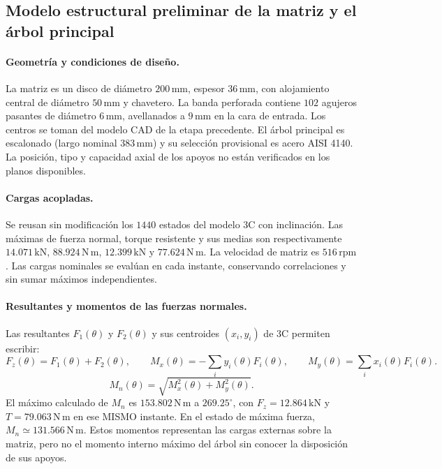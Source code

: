 \subsection{Modelo estructural preliminar de la matriz y el árbol principal}
\paragraph{Geometría y condiciones de diseño.}
La matriz es un disco de diámetro $200\,\mathrm{mm}$, espesor $36\,\mathrm{mm}$, con alojamiento central de diámetro $50\,\mathrm{mm}$ y chavetero. La banda perforada contiene $102$ agujeros pasantes de diámetro $6\,\mathrm{mm}$, avellanados a $9\,\mathrm{mm}$ en la cara de entrada. Los centros se toman del modelo CAD de la etapa precedente. El árbol principal es escalonado (largo nominal $383\,\mathrm{mm}$) y su selección provisional es acero AISI 4140. La posición, tipo y capacidad axial de los apoyos no están verificados en los planos disponibles.

\paragraph{Cargas acopladas.}
Se reusan sin modificación los $1440$ estados del modelo 3C con inclinación. Las máximas de fuerza normal, torque resistente y sus medias son respectivamente $14.071\,\mathrm{kN}$, $88.924\,\mathrm{N\,m}$, $12.399\,\mathrm{kN}$ y $77.624\,\mathrm{N\,m}$. La velocidad de matriz es $516\,\mathrm{rpm}$. Las cargas nominales se evalúan en cada instante, conservando correlaciones y sin sumar máximos independientes.

\paragraph{Resultantes y momentos de las fuerzas normales.}
Las resultantes $F_1(\theta)$ y $F_2(\theta)$ y sus centroides $(x_i,y_i)$ de 3C permiten escribir:
\begin{equation}
 F_z(\theta)=F_1(\theta)+F_2(\theta),\qquad
 M_x(\theta)=-\sum_i y_i(\theta)F_i(\theta),\qquad
 M_y(\theta)=\sum_i x_i(\theta)F_i(\theta).
\end{equation}
\begin{equation}
 M_n(\theta)=\sqrt{M_x^2(\theta)+M_y^2(\theta)}.
\end{equation}
El máximo calculado de $M_n$ es $153.802\,\mathrm{N\,m}$ a $269.25^\circ$, con $F_z=12.864\,\mathrm{kN}$ y $T=79.063\,\mathrm{N\,m}$ en ese MISMO instante. En el estado de máxima fuerza, $M_n\simeq131.566\,\mathrm{N\,m}$. Estos momentos representan las cargas externas sobre la matriz, pero no el momento interno máximo del árbol sin conocer la disposición de sus apoyos.

